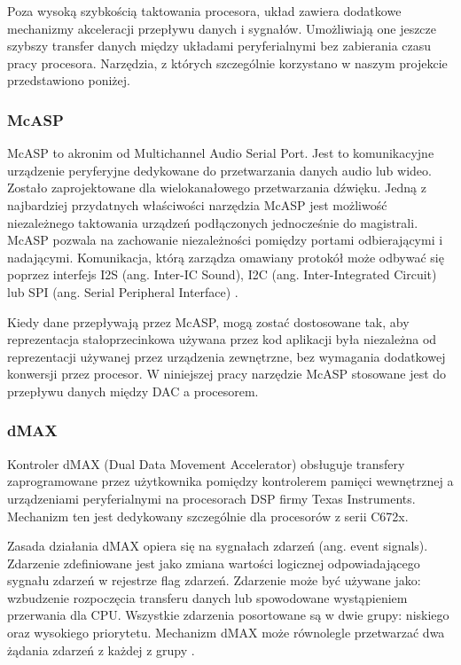 Poza wysoką szybkością taktowania procesora, układ zawiera dodatkowe mechanizmy akceleracji przepływu danych i sygnałów. Umożliwiają one jeszcze szybszy transfer danych między układami peryferialnymi bez zabierania czasu pracy procesora. Narzędzia, z których szczególnie korzystano w naszym projekcie przedstawiono poniżej.

\subsubsection{McASP}
McASP to akronim od Multichannel Audio Serial Port. Jest to komunikacyjne urządzenie peryferyjne dedykowane do przetwarzania danych audio lub wideo. Zostało zaprojektowane dla wielokanałowego przetwarzania dźwięku. Jedną z najbardziej przydatnych właściwości narzędzia McASP jest możliwość niezależnego taktowania urządzeń podłączonych jednocześnie do magistrali. McASP pozwala na zachowanie niezależności pomiędzy portami odbierającymi i nadającymi. Komunikacja, którą zarządza omawiany protokół może odbywać się poprzez interfejs I2S (ang. Inter-IC Sound), I2C (ang. Inter-Integrated Circuit) lub SPI (ang. Serial Peripheral Interface) \cite{dokumentacja_mcasp}.

Kiedy dane przepływają przez McASP, mogą zostać dostosowane tak, aby reprezentacja stałoprzecinkowa używana przez kod aplikacji była niezależna od reprezentacji używanej przez urządzenia zewnętrzne, bez wymagania dodatkowej konwersji przez procesor.
W niniejszej pracy narzędzie McASP stosowane jest do przepływu danych między DAC a procesorem. 

\subsubsection{dMAX} \label{par:dMax}
Kontroler dMAX (Dual Data Movement Accelerator) obsługuje transfery zaprogramowane przez użytkownika pomiędzy kontrolerem pamięci wewnętrznej a urządzeniami peryferialnymi na procesorach DSP firmy Texas Instruments. Mechanizm ten jest dedykowany szczególnie dla procesorów z serii C672x.

Zasada działania dMAX opiera się na sygnałach zdarzeń (ang. event signals). Zdarzenie zdefiniowane jest jako zmiana wartości logicznej odpowiadającego sygnału zdarzeń w rejestrze flag zdarzeń. Zdarzenie może być używane jako: wzbudzenie rozpoczęcia transferu danych lub spowodowane wystąpieniem przerwania dla CPU. Wszystkie zdarzenia posortowane są w dwie grupy: niskiego oraz wysokiego priorytetu. Mechanizm dMAX może równolegle przetwarzać dwa żądania zdarzeń z każdej z grupy \cite{dokumentacja_dmax}.

